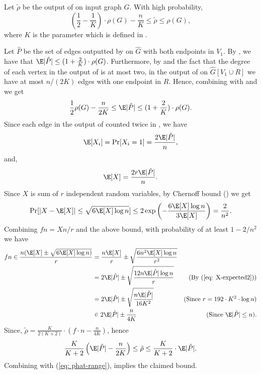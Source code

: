 \begin{lemma}\label{lem: error-bound}
Let $\tilde{\rho}$ be the output of  on input graph $G$. With high probability, 
$$ \left(\frac{1}{2} - \frac{1}{K}\right)\cdot \rho(G) - \frac{n}{K} \leq \tilde{\rho} \leq \rho(G),$$
where $K$ is the parameter which is defined in \algtwo{}.
\end{lemma}
\begin{myproof}
Let $\hat{P}$ be the set of edges outputted by \algtwo{} on $\hat{G}$ with both endpoints in $V_1$. By , we have that $\E|\hat{P}| \leq (1 + \frac{2}{K})\cdot\rho(G)$. Furthermore, by  and the fact that the degree of each vertex in the output of \algtwo{} is at most two, in the output of \algtwo{} on $\hat{G}[V_1 \cup R]$ we have at most $n/(2K)$ edges with one endpoint in $R$. Hence, combining with  and  we get
\begin{align}\label{eq: phat-range}
    \frac{1}{2}\rho(G) - \frac{n}{2K} \leq \E|\hat{P}| \leq (1 + \frac{2}{K})\cdot \rho(G).
\end{align}
Since each edge in the output of \algtwo{} counted twice in , we have 
\begin{align*}
    \E[X_i] = \Pr[X_i = 1] = \frac{2 \E|\hat{P}|}{n},
\end{align*}
and,
\begin{align}\label{eq: X-expected2}
    \E[X] = \frac{2r \E|\hat{P}|}{n}.
\end{align}
Since $X$ is sum of $r$ independent random variables, by Chernoff bound () we get
\begin{align*}
    \Pr[|X - \E[X]| \leq \sqrt{6 \E[X] \log n}] \leq 2 \exp \left(-\frac{6 \E[X] \log n}{3 \E[X]} \right) = \frac{2}{n^2}.
\end{align*}
Combining $fn = Xn/r$ and the above bound, with probability of at least $1 - 2/n^2$ we have
\begin{align*}
    fn \in \frac{n(\E[X] \pm \sqrt{6 \E[X] \log n)}}{r} & = \frac{n\E[X]}{r} \pm \sqrt{\frac{6 n^2\E[X] \log n}{r^2}}\\
    & = 2\E|\hat{P}| \pm \sqrt{\frac{12n\E|\hat{P}| \log n}{r}} & (\text{By }(\ref{eq: X-expected2}))\\
    & = 2\E|\hat{P}| \pm \sqrt{\frac{n\E|\hat{P}|}{16K^2}} & (\text{Since } r = 192 \cdot K^2 \cdot \log n) \\
    & \in 2\E|\hat{P}| \pm \frac{n}{4K} & (\text{Since } \E|\hat{P}| \leq n).
\end{align*}
Since, $\tilde{\rho} = \frac{K}{2(K+2)}\cdot (f \cdot n - \frac{n}{4K})$, hence
\begin{align*}
    \frac{K}{K+2}\left(\E|\hat{P}| - \frac{n}{2K} \right) \leq \tilde{\rho} \leq \frac{K}{K+2} \cdot \E| \hat{P}|.
\end{align*}
Combining with (\ref{eq: phat-range}), implies the claimed bound.
\end{myproof}

